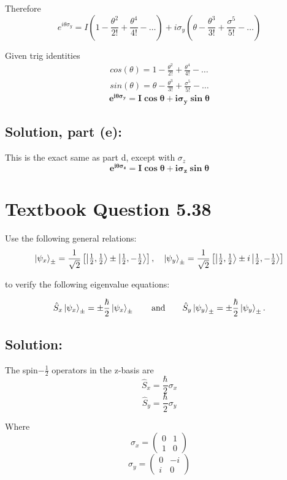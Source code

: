 \documentclass[12pt]{article}
\begin{document}
        Therefore
        \[
        e^{i\theta \sigma_y} = I \left( 1 - \frac{\theta^2}{2!} + \frac{\theta^4}{4!} - \dots \right) + i \sigma_y \left( \theta - \frac{\theta^3}{3!} + \frac{\sigma^5}{5!} - \dots \right)
        \]

        Given trig identities
        \begin{align*}
            cos(\theta) = 1 - \frac{\theta^2}{2!} + \frac{\theta^4}{4!} - \dots \\
            sin(\theta) = \theta - \frac{\theta^3}{3!} + \frac{\sigma^5}{5!} - \dots
        \end{align*}
        \[
            \boldsymbol{\boxed{e^{i\theta \sigma_y} = I \cos\theta + i \sigma_y \sin\theta}}
        \]
        
    \subsection{Solution, part (e):}
        This is the exact same as part d, except with $\sigma_z$
        \[
        \boldsymbol{\boxed{e^{i\theta \sigma_z} = I \cos\theta + i \sigma_z \sin\theta}}
        \]

\section{Textbook Question 5.38}
    Use the following general relations:
    \[
        \ket{\psi_x}_{\pm} = \frac{1}{\sqrt{2}} \left[ \ket{\tfrac{1}{2}, \tfrac{1}{2}} \pm \ket{\tfrac{1}{2}, -\tfrac{1}{2}} \right], \quad
        \ket{\psi_y}_{\pm} = \frac{1}{\sqrt{2}} \left[ \ket{\tfrac{1}{2}, \tfrac{1}{2}} \pm i \ket{\tfrac{1}{2}, -\tfrac{1}{2}} \right]
    \]

    to verify the following eigenvalue equations:
    
    \[
        \hat{S}_x \ket{\psi_x}_{\pm} = \pm \frac{\hbar}{2} \ket{\psi_x}_{\pm} \qquad \text{and} \qquad
        \hat{S}_y \ket{\psi_y}_{\pm} = \pm \frac{\hbar}{2} \ket{\psi_y}_{\pm}.
    \]

    \subsection{Solution:}
        The spin$-\frac{1}{2}$ operators in the z-basis are
        \[
            \hat{S}_x = \frac{\hbar}{2} \sigma_x
        \]
        \[
            \hat{S}_y = \frac{\hbar}{2} \sigma_y
        \]

        Where 
        \[
            \sigma_x = \begin{pmatrix}
                0 & 1 \\
                1 & 0
            \end{pmatrix}
        \]
        \[
            \sigma_y = \begin{pmatrix}
                0 & -i \\
                i & 0
            \end{pmatrix}
        \]
        
\end{document}
